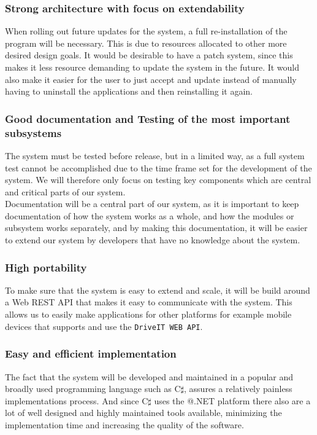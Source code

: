 \subsubsection{Strong architecture with focus on extendability}
When rolling out future updates for the system, a full re-installation of the program will be necessary. This is due to resources allocated to other more desired design goals. It would be desirable to have a patch system, since this makes it less resource demanding to update the system in the future. It would also make it easier for the user to just accept and update instead of manually having to uninstall the applications and then reinstalling it again.\\

\subsubsection{Good documentation and Testing of the most important subsystems}
The system must be tested before release, but in a limited way, as a full system test cannot be accomplished due to the time frame set for the development of the system. We will therefore only focus on testing key components which are central and critical parts of our system.\\

Documentation will be a central part of our system, as it is important to keep documentation of how the system works as a whole, and how the modules or subsystem works separately, and by making this documentation, it will be easier to extend our system by developers that have no knowledge about the system.\\

\subsubsection{High portability}
To make sure that the system is easy to extend and scale, it will be build around a Web REST API that makes it easy to communicate with the system. This allows us to easily make applications for other platforms for example mobile devices that supports and use the \texttt{DriveIT WEB API}.\\

\subsubsection{Easy and efficient implementation}
The fact that the system will be developed and maintained in a popular and broadly used programming language such as C$\sharp$, assures a relatively painless implementations process. And since C$\sharp$ uses the @.NET platform there also are a lot of well designed and highly maintained tools available, minimizing the implementation time and increasing the quality of the software. \\

